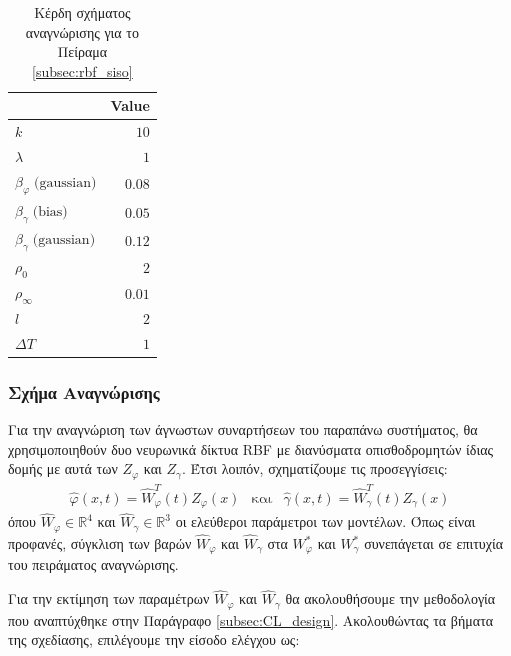 {\begin{table}
	\centering
	\captionsetup{format=plain}
	\caption{Κέρδη σχήματος αναγνώρισης για το Πείραμα \ref{subsec:rbf_siso}}
	\label{tab:rbf_siso_params}
	\begin{tabular}{ l | r }
		\hline\hline
		\text{Parameter} & Value \\ \hline\hline
		$k$             & $10$   \\ \hline
		$\lambda$       & $1 $   \\ \hline
		$\beta_{\varphi} \;\text{(gaussian)}$  & $0.08$ \\ \hline
		$\beta_{\gamma} \;\text{(bias)}$     & $0.05$ \\ \hline
		$\beta_{\gamma} \;\text{(gaussian)}$ & $0.12$  \\ \hline
		$\rho_0      $ & $2$  \\ \hline
		$\rho_\infty $ & $0.01$  \\ \hline
		$l           $ & $2$  \\ \hline
		$\textit{ΔΤ} $  & $1$ 	\\ \hline \hline	
	\end{tabular}
\end{table}


\subsubsection{Σχήμα Αναγνώρισης}
Για την αναγνώριση των άγνωστων συναρτήσεων του παραπάνω συστήματος, θα χρησιμοποιηθούν δυο νευρωνικά δίκτυα RBF με διανύσματα  οπισθοδρομητών ίδιας δομής με αυτά των $Z_\varphi$ και $Z_\gamma$. Έτσι λοιπόν, σχηματίζουμε τις προσεγγίσεις:
\begin{equation*}
	\begin{matrix}
	\hat{\varphi}(x,t)  = \hat{W}_{\varphi}^T(t) Z_\varphi(x) & \text{και} & \hat{\gamma}(x,t) = \hat{W}_{\gamma}^T(t) Z_\gamma(x) 
	\end{matrix}
\end{equation*}
όπου $\hat{W}_{\varphi} \in \mathbb{R}^4$ και $\hat{W}_{\gamma} \in \mathbb{R}^3$ οι ελεύθεροι παράμετροι των μοντέλων. Όπως είναι προφανές, σύγκλιση των βαρών $\hat{W}_{\varphi}$ και $\hat{W}_{\gamma}$ στα $W_{\varphi}^*$ και $W_{\gamma}^*$ συνεπάγεται σε επιτυχία του πειράματος αναγνώρισης.

Για την εκτίμηση των παραμέτρων $\hat{W}_{\varphi}$ και $\hat{W}_{\gamma}$ θα ακολουθήσουμε την μεθοδολογία που αναπτύχθηκε στην Παράγραφο \ref{subsec:CL_design}. Ακολουθώντας τα βήματα της σχεδίασης, επιλέγουμε την είσοδο ελέγχου ως:

}
